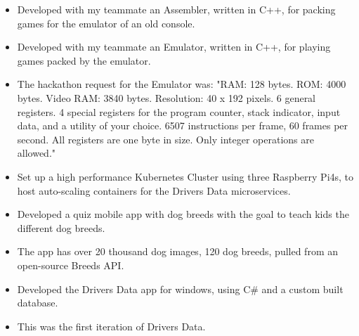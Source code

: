 \documentclass[10pt,a4paper,ragged2e]{resume}
\begin{document}
\begin{fullwidth}
        \begin{itemize}
            \item Developed with my teammate an Assembler, written in C++, for packing games for the emulator of an old console.
        \end{itemize}
        \divider

        \begin{itemize}
            \item Developed with my teammate an Emulator, written in C++, for playing games packed by the emulator.
            \item The hackathon request for the Emulator was: "RAM: 128 bytes.
            ROM: 4000 bytes.
            Video RAM: 3840 bytes.
            Resolution: 40 x 192 pixels.
            6 general registers.
            4 special registers for the program counter, stack indicator, input data, and a utility of your choice.
            6507 instructions per frame, 60 frames per second.
            All registers are one byte in size.
            Only integer operations are allowed."
        \end{itemize}
        \divider

        \begin{itemize}
            \item Set up a high performance Kubernetes Cluster using three Raspberry Pi4s, to host auto-scaling containers for the Drivers Data microservices.
        \end{itemize}
        \divider


        \begin{itemize}
            \item Developed a quiz mobile app with dog breeds with the goal to teach kids the different dog breeds.
            \item The app has over 20 thousand dog images, 120 dog breeds, pulled from an open-source Breeds API.
        \end{itemize}
        \divider

        \begin{itemize}
            \item Developed the Drivers Data app for windows, using C\# and a custom built database.
            \item This was the first iteration of Drivers Data.
        \end{itemize}
    \end{fullwidth}


    \clearpage\nocite{*}
\end{document}
